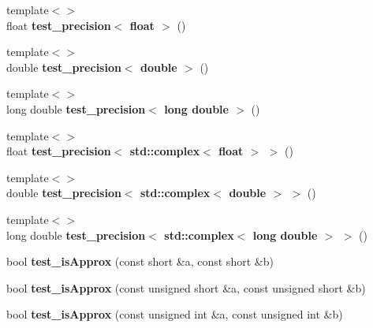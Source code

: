 \begin{DoxyCompactItemize}
{\footnotesize template$<$$>$ }\\float {\bfseries test\+\_\+precision$<$ float $>$} ()
\item 
\mbox{\label{namespace_eigen_a80318b650b1e0ff8ff96b9efad266ba1}} 
{\footnotesize template$<$$>$ }\\double {\bfseries test\+\_\+precision$<$ double $>$} ()
\item 
\mbox{\label{namespace_eigen_a7683c2a014c5259e16ad4ab9e0170232}} 
{\footnotesize template$<$$>$ }\\long double {\bfseries test\+\_\+precision$<$ long double $>$} ()
\item 
\mbox{\label{namespace_eigen_a9b3936f38700642414b511b0492b60d4}} 
{\footnotesize template$<$$>$ }\\float {\bfseries test\+\_\+precision$<$ std\+::complex$<$ float $>$ $>$} ()
\item 
\mbox{\label{namespace_eigen_ab77ec7cb379d51354254b797f722983c}} 
{\footnotesize template$<$$>$ }\\double {\bfseries test\+\_\+precision$<$ std\+::complex$<$ double $>$ $>$} ()
\item 
\mbox{\label{namespace_eigen_a8ecaff596bd9f5e6d98a49edc6cfd34f}} 
{\footnotesize template$<$$>$ }\\long double {\bfseries test\+\_\+precision$<$ std\+::complex$<$ long double $>$ $>$} ()
\item 
\mbox{\label{namespace_eigen_a4d0bff43a477855ac33abff23165b014}} 
bool {\bfseries test\+\_\+is\+Approx} (const short \&a, const short \&b)
\item 
\mbox{\label{namespace_eigen_a87240ade67cf9ccceb99dcfd26e9c487}} 
bool {\bfseries test\+\_\+is\+Approx} (const unsigned short \&a, const unsigned short \&b)
\item 
\mbox{\label{namespace_eigen_a3a0ab8febdb4a2da5d29b3a8b71a6773}} 
bool {\bfseries test\+\_\+is\+Approx} (const unsigned int \&a, const unsigned int \&b)
\item 
\mbox{\label{namespace_eigen_a0834e7b5344f1750e7ed932bb9fe18b1}} 

\end{DoxyCompactItemize}
